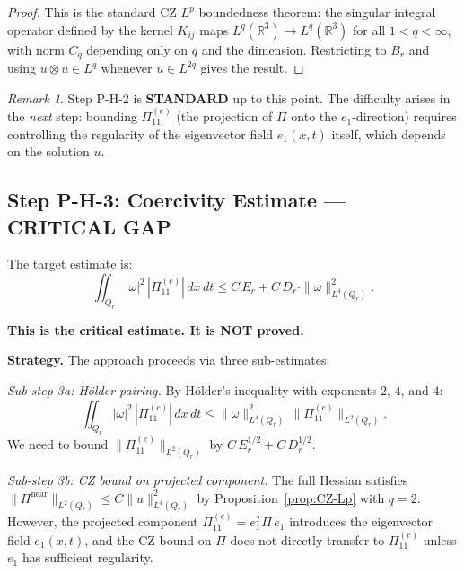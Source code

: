 \documentclass[11pt]{article}
\theoremstyle{definition}
\theoremstyle{remark}
\newtheorem{remark}[theorem]{Remark}
\newcommand{\R}{\mathbb{R}}
\begin{document}
\begin{proof}
This is the standard CZ $L^p$ boundedness theorem: the singular integral operator
defined by the kernel $K_{ij}$ maps $L^q(\R^3) \to L^q(\R^3)$ for all
$1 < q < \infty$, with norm $C_q$ depending only on $q$ and the dimension.
Restricting to $B_r$ and using $u\otimes u \in L^{q}$ whenever $u \in L^{2q}$
gives the result.
\end{proof}

\begin{remark}
Step P-H-2 is \textbf{STANDARD} up to this point.  The difficulty arises in the
\emph{next} step: bounding $\Pi_{11}^{(e)}$ (the projection of $\Pi$ onto the
$e_1$-direction) requires controlling the regularity of the eigenvector field
$e_1(x,t)$ itself, which depends on the solution $u$.
\end{remark}

\subsection{Step P-H-3: Coercivity Estimate --- \textbf{CRITICAL GAP}}
\label{sec:PH3}

The target estimate is:
\begin{equation}\label{eq:coercivity-target}
  \boxed{
    \iint_{Q_r} |\omega|^2\, |\Pi_{11}^{(e)}|\, dx\, dt
    \leq C\, E_r + C\, D_r\cdot \|\omega\|_{L^4(Q_r)}^2.
  }
\end{equation}

\textbf{This is the critical estimate.  It is \textbf{NOT} proved.}

\medskip
\noindent\textbf{Strategy.}  The approach proceeds via three sub-estimates:

\smallskip
\noindent\emph{Sub-step 3a: H\"older pairing.}
By H\"older's inequality with exponents $2$, $4$, and $4$:
\begin{equation}\label{eq:holder-split}
  \iint_{Q_r} |\omega|^2\, |\Pi_{11}^{(e)}|\, dx\, dt
  \leq \|\omega\|_{L^4(Q_r)}^2\, \|\Pi_{11}^{(e)}\|_{L^2(Q_r)}.
\end{equation}
We need to bound $\|\Pi_{11}^{(e)}\|_{L^2(Q_r)}$ by $C\, E_r^{1/2} + C\, D_r^{1/2}$.

\smallskip
\noindent\emph{Sub-step 3b: CZ bound on projected component.}
The full Hessian satisfies $\|\Pi^{\mathrm{near}}\|_{L^2(Q_r)} \leq C\|u\|_{L^4(Q_r)}^2$
by Proposition~\ref{prop:CZ-Lp} with $q = 2$.  However, the projected component
$\Pi_{11}^{(e)} = e_1^T \Pi\, e_1$ introduces the eigenvector field $e_1(x,t)$,
and the CZ bound on $\Pi$ does not directly transfer to $\Pi_{11}^{(e)}$ unless
$e_1$ has sufficient regularity.
\end{document}
